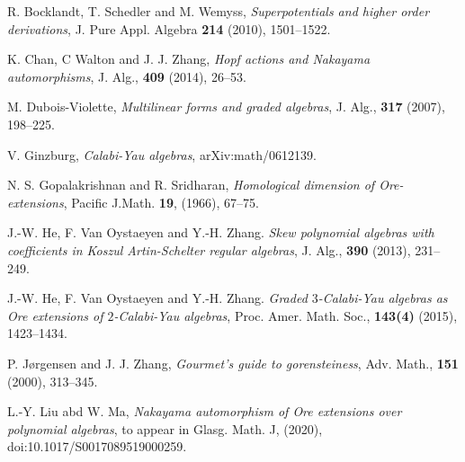 \documentclass[a4paper,10pt]{amsart}
\theoremstyle{definition}
\numberwithin{equation}{section}
\begin{document}
\begin{thebibliography}{10}


R. Bocklandt, T. Schedler and M. Wemyss, \emph{Superpotentials and higher order derivations}, J. Pure Appl. Algebra \textbf{214} (2010), 1501--1522.





%

K. Chan, C Walton and J. J. Zhang, \emph{Hopf actions and Nakayama automorphisms}, J. Alg., \textbf{409} (2014), 26--53.


M. Dubois-Violette, \emph{Multilinear forms and graded algebras}, J. Alg., \textbf{317} (2007), 198--225.

V. Ginzburg, \emph{Calabi-Yau algebras}, arXiv:math/0612139.

N. S. Gopalakrishnan and R. Sridharan, \emph{Homological dimension of Ore-extensions}, Pacific J.Math. \textbf{19}, (1966), 67--75.

J.-W. He, F. Van Oystaeyen and Y.-H. Zhang. \emph{Skew polynomial algebras with coefficients in Koszul Artin-Schelter regular algebras}, J. Alg., \textbf{390} (2013), 231--249.

J.-W. He, F. Van Oystaeyen and Y.-H. Zhang. \emph{Graded $3$-Calabi-Yau algebras as Ore extensions of $2$-Calabi-Yau algebras}, Proc. Amer. Math. Soc., \textbf{143(4)} (2015), 1423--1434.

P. J\o rgensen and J. J. Zhang, \emph{Gourmet's guide to gorensteiness}, Adv. Math., \textbf{151} (2000), 313--345.


L.-Y. Liu abd W. Ma, \emph{Nakayama automorphism of Ore extensions over polynomial algebras}, to appear in Glasg. Math. J, (2020), doi:10.1017/S0017089519000259.


\end{thebibliography}
\end{document}
